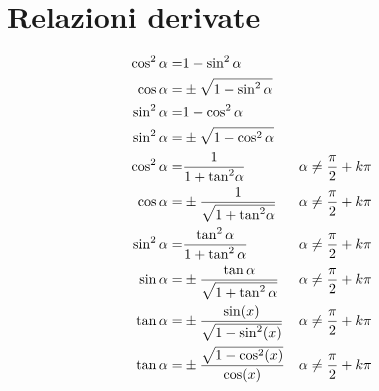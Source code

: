 \section{Relazioni derivate}\label{sec:relazioni-derivate}
\begin{align*}
\cos^{2}\alpha=&{}1-\sin^{2}\alpha\\\index{Coseno!dato!seno}
\cos\alpha=&{}\pm\sqrt{1-\sin^{2}\alpha}\\
\sin^{2}\alpha=&{}1-\cos^{2}\alpha \\\index{Seno!dato!coseno}
\sin^{2}\alpha=&{}\pm\sqrt{1-\cos^{2}\alpha}\\
\cos^{2}\alpha=&{}\dfrac{1}{1+{\tan}^{2}\alpha} &&\alpha\neq\dfrac{\pi}{2}+k\pi\\
\cos\alpha=&{}\pm\dfrac{1}{\sqrt{1+{\tan}^{2}\alpha}} &&\alpha\neq\dfrac{\pi}{2}+k\pi\\\index{Coseno!dato!tangente}
\sin^{2}\alpha=&{}\dfrac{\tan^{2}\alpha}{1+\tan^{2}\alpha}&&\alpha\neq\dfrac{\pi}{2}+k\pi\\
\sin\alpha=&{}\pm\dfrac{\tan\alpha}{\sqrt{1+\tan^{2}\alpha}}&&\alpha\neq\dfrac{\pi}{2}+k\pi\\\index{Seno!dato!tangente}
\tan\alpha=&{}\pm\dfrac{\sin(x)}{\sqrt{1-\sin^2(x)}}&&\alpha\neq\dfrac{\pi}{2}+k\pi\\\index{Tangente!dato!seno}
\tan\alpha=&{}\pm\dfrac{\sqrt{1-\cos^2(x)}}{\cos(x)}
&&\alpha\neq\dfrac{\pi}{2}+k\pi\index{Tangente!dato!coseno}
\end{align*}
